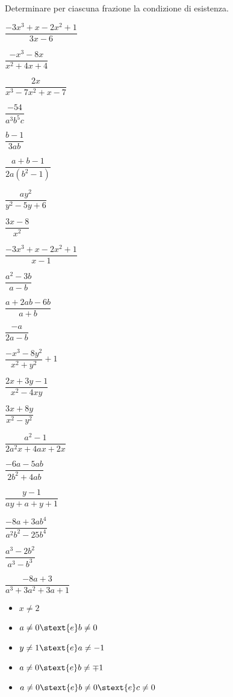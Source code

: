 \begin{esercizio}
\label{ese:19.1}
Determinare per ciascuna frazione la condizione di esistenza.
\begin{multicols}{3}
\begin{enumeratea}
 \item \(\dfrac{-3x^{3}+x-2x^{2}+1}{3x-6}\)
 \item \(\dfrac{-x^{3}-8x}{x^{2}+4x+4}\)
 \item \(\dfrac{2x}{x^{3}-7x^{2}+x-7}\)
 \item \(\dfrac{-54}{a^{3}b^{5}c}\)
 \item \(\dfrac{b-1}{3ab}\)
 \item \(\dfrac{a+b-1}{2a \left(b^{2}-1\right)}\)
 \item \(\dfrac{ay^{2}}{y^{2}-5y+6}\)
 \item \(\dfrac{3x-8}{x^{2}}\)
 \item \(\dfrac{-3x^{3}+x-2x^{2}+1}{x-1}\)
 \item \(\dfrac{a^{{2}}-3b}{a-b}\)
 \item \(\dfrac{a+2ab-6b}{a+b}\)
 \item \(\dfrac{-a}{2a-b}\)
 \item \(\dfrac{-x^{{3}}-8y^{{2}}}{x^{{2}}+y^{{2}}}+1\)
 \item \(\dfrac{2x+3y-1}{x^{2}-4xy}\)
 \item \(\dfrac{3x+8y}{x^{2}-y^{2}}\)
 \item \(\dfrac{a^{2}-1}{2a^{2}x+4ax+2x}\)
 \item \(\dfrac{-6a-5ab}{2b^{2}+4ab}\)
 \item \(\dfrac{y-1}{ay+a+y+1}\)
 \item \(\dfrac{-8a+3ab^{4}}{a^{2}b^{2}-25b^{4}}\)
 \item \(\dfrac{a^{3}-2b^{2}}{a^{3}-b^{3}}\)
 \item \(\dfrac{-8a+3}{a^{3}+3a^{2}+3a+1}\)
\end{enumeratea}
\end{multicols}
\begin{multicols}{3}
\begin{itemize} [label={\framebox(12,12){}}]
 \item \(x \neq 2\)
 \item \(a \neq 0 \stext{e} b \neq 0\)
 \item \(y \neq 1\stext{e} a \neq -1\)
 \item \(a \neq 0 \stext{e} b \neq \mp 1\)
 \item \(a \neq 0 \stext{e} b \neq 0 \stext{e} c \neq 0\)

\end{itemize}
\end{multicols}
\end{esercizio}
